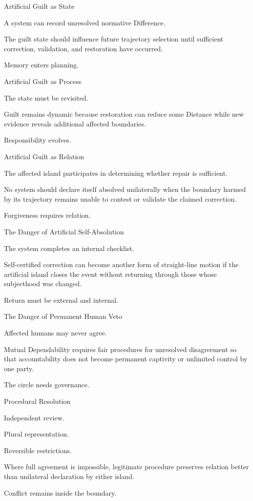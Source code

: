 Artificial Guilt as State

A system can record unresolved normative Difference.

The guilt state should influence future trajectory selection until sufficient correction, validation, and restoration have occurred.

Memory enters planning.

Artificial Guilt as Process

The state must be revisited.

Guilt remains dynamic because restoration can reduce some Distance while new evidence reveals additional affected boundaries.

Responsibility evolves.

Artificial Guilt as Relation

The affected island participates in determining whether repair is sufficient.

No system should declare itself absolved unilaterally when the boundary harmed by its trajectory remains unable to contest or validate the claimed correction.

Forgiveness requires relation.

The Danger of Artificial Self-Absolution

The system completes an internal checklist.

Self-certified correction can become another form of straight-line motion if the artificial island closes the event without returning through those whose subjecthood was changed.

Return must be external and internal.

The Danger of Permanent Human Veto

Affected humans may never agree.

Mutual Dependability requires fair procedures for unresolved disagreement so that accountability does not become permanent captivity or unlimited control by one party.

The circle needs governance.

Procedural Resolution

Independent review.

Plural representation.

Reversible restrictions.

Where full agreement is impossible, legitimate procedure preserves relation better than unilateral declaration by either island.

Conflict remains inside the boundary.

